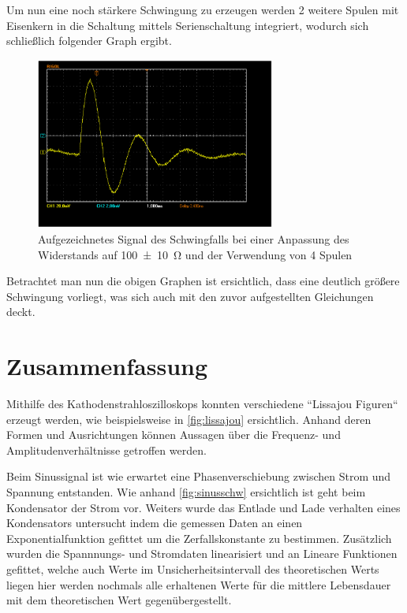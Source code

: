 \documentclass[11pt,ngerman]{scrartcl}
\begin{document}
Um nun eine noch stärkere Schwingung zu erzeugen werden 2 weitere Spulen mit
Eisenkern in die Schaltung mittels Serienschaltung integriert, wodurch sich
schließlich folgender Graph ergibt.

\begin{figure}[H]
	\begin{center}
		\includegraphics[width=0.7\textwidth]{Bild_versuch3_c_100_4}
	\end{center}
	\caption{Aufgezeichnetes Signal des Schwingfalls bei einer Anpassung des
		Widerstands auf \SI{100(10)}{\ohm} und der Verwendung von 4 Spulen}
	\label{fig:schwingfall_100_4}
\end{figure}

Betrachtet man nun die obigen Graphen ist ersichtlich, dass eine deutlich
größere Schwingung vorliegt, was sich auch mit den zuvor aufgestellten
Gleichungen deckt.




\section{Zusammenfassung}

Mithilfe des Kathodenstrahloszilloskops konnten verschiedene ``Lissajou
Figuren`` erzeugt werden, wie beispielsweise in \autoref{fig:lissajou}
ersichtlich. Anhand deren Formen und Ausrichtungen können Aussagen über die
Frequenz- und Amplitudenverhältnisse getroffen werden.

Beim Sinussignal ist wie erwartet eine Phasenverschiebung zwischen Strom und
Spannung entstanden. Wie anhand \autoref{fig:sinusschw} ersichtlich ist geht
beim Kondensator der Strom vor. Weiters wurde das Entlade und Lade verhalten
eines Kondensators untersucht indem die gemessen Daten an einen
Exponentialfunktion gefittet um die Zerfallskonstante zu bestimmen. Zusätzlich
wurden die Spannnungs- und Stromdaten linearisiert und an Lineare Funktionen
gefittet, welche auch Werte im Unsicherheitsintervall des theoretischen Werts
liegen hier werden nochmals alle erhaltenen Werte für die mittlere Lebensdauer mit
dem theoretischen Wert gegenübergestellt.
\end{document}
